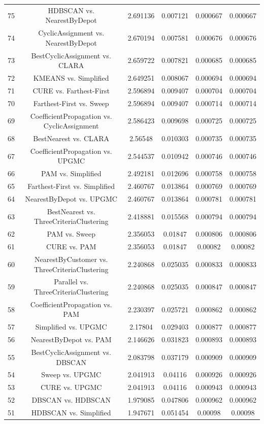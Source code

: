 \documentclass[a4paper,10pt]{article}
\begin{document}
\begin{landscape}
\begin{table}[!htp]
\begin{tabular}{cccccc}
75&HDBSCAN vs. NearestByDepot&2.691136&0.007121&0.000667&0.000667\\
74&CyclicAssignment vs. NearestByDepot&2.670194&0.007581&0.000676&0.000676\\
73&BestCyclicAssignment vs. CLARA&2.659722&0.007821&0.000685&0.000685\\
72&KMEANS vs. Simplified&2.649251&0.008067&0.000694&0.000694\\
71&CURE vs. Farthest-First&2.596894&0.009407&0.000704&0.000704\\
70&Farthest-First vs. Sweep&2.596894&0.009407&0.000714&0.000714\\
69&CoefficientPropagation vs. CyclicAssignment&2.586423&0.009698&0.000725&0.000725\\
68&BestNearest vs. CLARA&2.56548&0.010303&0.000735&0.000735\\
67&CoefficientPropagation vs. UPGMC&2.544537&0.010942&0.000746&0.000746\\
66&PAM vs. Simplified&2.492181&0.012696&0.000758&0.000758\\
65&Farthest-First vs. Simplified&2.460767&0.013864&0.000769&0.000769\\
64&NearestByDepot vs. UPGMC&2.460767&0.013864&0.000781&0.000781\\
63&BestNearest vs. ThreeCriteriaClustering&2.418881&0.015568&0.000794&0.000794\\
62&PAM vs. Sweep&2.356053&0.01847&0.000806&0.000806\\
61&CURE vs. PAM&2.356053&0.01847&0.00082&0.00082\\
60&NearestByCustomer vs. ThreeCriteriaClustering&2.240868&0.025035&0.000833&0.000833\\
59&Parallel vs. ThreeCriteriaClustering&2.240868&0.025035&0.000847&0.000847\\
58&CoefficientPropagation vs. PAM&2.230397&0.025721&0.000862&0.000862\\
57&Simplified vs. UPGMC&2.17804&0.029403&0.000877&0.000877\\
56&NearestByDepot vs. PAM&2.146626&0.031823&0.000893&0.000893\\
55&BestCyclicAssignment vs. DBSCAN&2.083798&0.037179&0.000909&0.000909\\
54&Sweep vs. UPGMC&2.041913&0.04116&0.000926&0.000926\\
53&CURE vs. UPGMC&2.041913&0.04116&0.000943&0.000943\\
52&DBSCAN vs. HDBSCAN&1.979085&0.047806&0.000962&0.000962\\
51&HDBSCAN vs. Simplified&1.947671&0.051454&0.00098&0.00098\\

\end{tabular}
\end{table}
\end{landscape}
\end{document}
